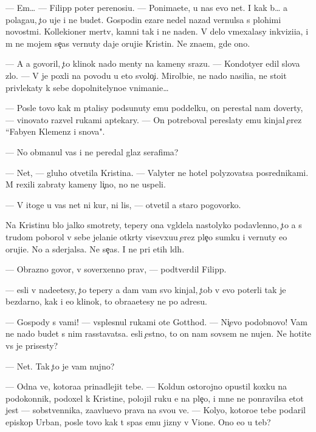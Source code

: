 \documentclass[10pt]{book}
\begin{document}
— Em… — Filipp poter perenosi{\q}u. — Ponima{\y}ete, u nas {\y}evo net. I kak b{\yi}… {\y}a polaga{\y}u, {\c}to uje i ne budet. Gospodin {\C}ezare nedel{\iu} nazad vernulsa s plohimi novost{\ia}mi. Kollek{\q}ioner mertv, kamni tak i ne na{\y}den{\yi}. V delo vmexalasy inkvizi{\q}i{\y}a, i m{\yi} ne mojem se{\y}{\c}as vernuty daje oruji{\y}e Kristin{\yi}. Ne zna{\y}em, gde ono.

— A {\y}a govoril, {\c}to klinok nado men{\ia}ty na kameny srazu. — Kondotyer {\q}edil slova zlo. — V{\yi} je poxli na povodu u eto{\y} svolo{\c}i. Mirol{\iu}bi{\y}e, ne nado nasili{\y}a, ne sto{\y}it privlekaty k sebe dopolnitelyno{\y}e vnimani{\y}e…

— Posle tovo kak m{\yi} p{\yi}talisy podsunuty {\y}emu poddelku, on perestal nam dover{\ia}ty, — vinovato razvel rukami aptekary. — On potreboval pereslaty {\y}emu kinjal {\c}erez ``Fabyen Klemenz i s{\yi}nov{\y}a".

— No obmanul vas i ne peredal glaz serafima?

— Net, — gluho otvetila Kristina. — Valyter ne hotel polyzovatsa posrednikami. M{\yi} rexili zabraty kameny li{\c}no, no ne uspeli.

— V itoge u vas net ni kur, ni lis{\yi}, — otvetil {\y}a staro{\y} pogovorko{\y}.

Na Kristinu b{\yi}lo jalko smotrety, tepery ona v{\yi}gl{\ia}dela nastolyko podavlenno{\y}, {\c}to {\y}a s trudom poborol v sebe jelani{\y}e otkr{\yi}ty visevxu{\y}u {\c}erez ple{\c}o sumku i vernuty {\y}e{\y}o oruji{\y}e. No {\y}a sderjalsa. Ne se{\y}{\c}as. I ne pri etih l{\iu}d{\ia}h.

— Obrazno govor{\ia}, v{\yi} soverxenno prav{\yi}, — podtverdil Filipp.

— {\Y}esli v{\yi} nade{\y}etesy, {\c}to tepery {\y}a dam vam svo{\y} kinjal, {\c}tob{\yi} v{\yi} {\y}evo poter{\ia}li tak je bezdarno, kak i {\y}e{\y}o klinok, to obra{\x}a{\y}etesy ne po adresu.

— Gospody s vami! — vsplesnul rukami ote{\q} Gotthod. — Ni{\c}evo podobnovo! Vam ne nado budet s nim rasstavatsa. {\Y}esli {\c}estno, to on nam sovsem ne nujen. Ne hotite vs{\e} je prisesty?

— Net. Tak {\c}to je vam nujno?

— Odna ve{\x}, kotora{\y}a prinadlejit tebe. — Koldun ostorojno opustil koxku na podokonnik, podoxel k Kristine, polojil ruku {\y}e{\y} na ple{\c}o, i mne ne ponravilsa etot jest — sobstvennika, za{\y}avl{\ia}{\y}u{\x}evo prava na svo{\y}u ve{\x}. — Koly{\q}o, kotoro{\y}e tebe podaril {\y}episkop Urban, posle tovo kak t{\yi} spas {\y}emu jizny v Vione. Ono {\y}e{\x}o u teb{\ia}?
\end{document}
